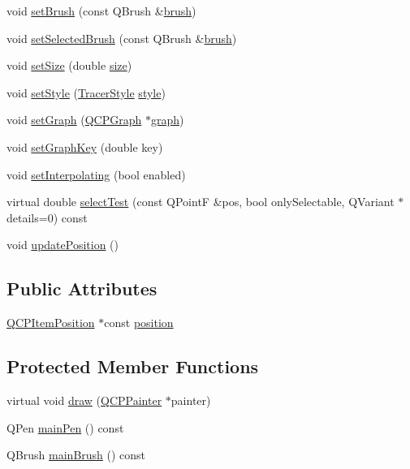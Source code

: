 \begin{DoxyCompactItemize}
void \hyperlink{class_q_c_p_item_tracer_a2c303f7470a30084daa201ed556b3c36}{set\-Brush} (const Q\-Brush \&\hyperlink{class_q_c_p_item_tracer_af07527750cfb6afc3c0ba4bec012011f}{brush})
\item 
void \hyperlink{class_q_c_p_item_tracer_a0f55c084980a7a312af859d3e7b558ef}{set\-Selected\-Brush} (const Q\-Brush \&\hyperlink{class_q_c_p_item_tracer_af07527750cfb6afc3c0ba4bec012011f}{brush})
\item 
void \hyperlink{class_q_c_p_item_tracer_ae47fe0617f5fef5fdb766999569be10a}{set\-Size} (double \hyperlink{class_q_c_p_item_tracer_a2607fcb3d01e90773ea1532fd6803760}{size})
\item 
void \hyperlink{class_q_c_p_item_tracer_a41a2ac4f1acd7897b4e2a2579c03204e}{set\-Style} (\hyperlink{class_q_c_p_item_tracer_a2f05ddb13978036f902ca3ab47076500}{Tracer\-Style} \hyperlink{class_q_c_p_item_tracer_a871832dace1709f877c3136fac7ae1ec}{style})
\item 
void \hyperlink{class_q_c_p_item_tracer_af5886f4ded8dd68cb4f3388f390790c0}{set\-Graph} (\hyperlink{class_q_c_p_graph}{Q\-C\-P\-Graph} $\ast$\hyperlink{class_q_c_p_item_tracer_a74c90da0e6730839b8d7cf6445a4ec1f}{graph})
\item 
void \hyperlink{class_q_c_p_item_tracer_a6840143b42f3b685cedf7c6d83a704c8}{set\-Graph\-Key} (double key)
\item 
void \hyperlink{class_q_c_p_item_tracer_a6c244a9d1175bef12b50afafd4f5fcd2}{set\-Interpolating} (bool enabled)
\item 
virtual double \hyperlink{class_q_c_p_item_tracer_ae71f3728421c83c188c117279ca050fd}{select\-Test} (const Q\-Point\-F \&pos, bool only\-Selectable, Q\-Variant $\ast$details=0) const 
\item 
void \hyperlink{class_q_c_p_item_tracer_a5b90296109e36384aedbc8908a670413}{update\-Position} ()
\end{DoxyCompactItemize}
\subsection*{Public Attributes}
\begin{DoxyCompactItemize}
\item 
\hyperlink{class_q_c_p_item_position}{Q\-C\-P\-Item\-Position} $\ast$const \hyperlink{class_q_c_p_item_tracer_a69917e2fdb2b3a929c196958feee7cbe}{position}
\end{DoxyCompactItemize}
\subsection*{Protected Member Functions}
\begin{DoxyCompactItemize}
\item 
virtual void \hyperlink{class_q_c_p_item_tracer_aaaf49b48382c730ec9be0e74c2538315}{draw} (\hyperlink{class_q_c_p_painter}{Q\-C\-P\-Painter} $\ast$painter)
\item 
Q\-Pen \hyperlink{class_q_c_p_item_tracer_af87132b7698d5bb35c96a8a0b9e7180e}{main\-Pen} () const 
\item 
Q\-Brush \hyperlink{class_q_c_p_item_tracer_aaf4e72e2d87f53279b9f9ba624961bf5}{main\-Brush} () const 
\end{DoxyCompactItemize}
